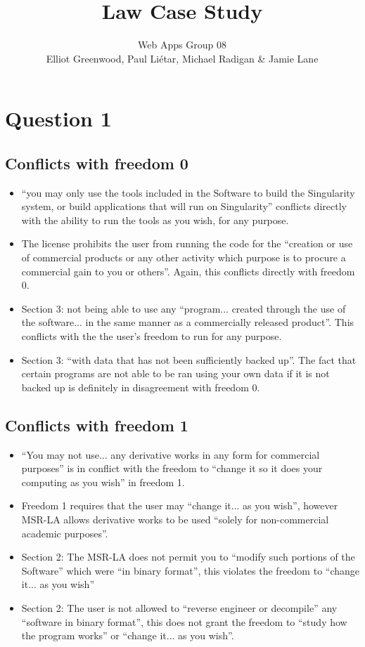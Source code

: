 \documentclass[a4paper, 6pt]{article}
\title{Law Case Study}
\author{Web Apps Group 08 \\ Elliot Greenwood, Paul Li\'etar, Michael Radigan \& Jamie Lane}
\date{}
\begin{document}
\maketitle
\section{Question 1}
\subsection{Conflicts with freedom 0}
\begin{itemize}
    \item ``you may only use the tools included in the Software to build the Singularity system, or build applications that will run on Singularity'' conflicts directly with the ability to run the tools as you wish, for any purpose.
    \item The license prohibits the user from running the code for the ``creation or use of commercial products or any other activity which purpose is to procure a commercial gain to you or others''. Again, this conflicts directly with freedom 0.
    \item Section 3: not being able to use any ``program... created through the use of the software... in the same manner as a commercially released product''. This conflicts with the the user's freedom to run for any purpose.
    \item Section 3: ``with data that has not been sufficiently backed up''. The fact that certain programs are not able to be ran using your own data if it is not backed up is definitely in disagreement with freedom 0.
\end{itemize}
\subsection{Conflicts with freedom 1}
\begin{itemize}
    \item ``You may not use... any derivative works in any form for commercial purposes'' is in conflict with the freedom to ``change it so it does your computing as you wish'' in freedom 1.
    \item Freedom 1 requires that the user may ``change it... as you wish'', however MSR-LA allows derivative works to be used ``solely for non-commercial academic purposes''.
    \item Section 2: The MSR-LA does not permit you to ``modify such portions of the Software'' which were ``in binary format'', this violates the freedom to ``change it... as you wish''
    \item Section 2: The user is not allowed to ``reverse engineer or decompile'' any ``software in binary format'', this does not grant the freedom to ``study how the program works'' or ``change it... as you wish''.
\end{itemize}
\end{document}
